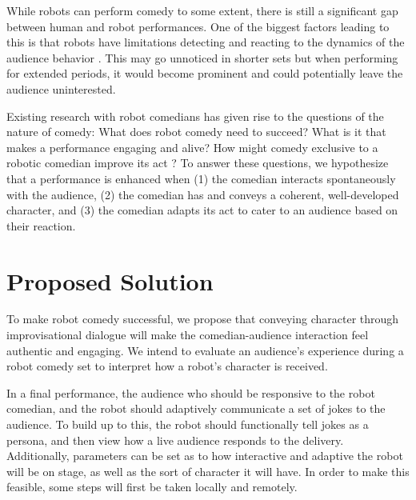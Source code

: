\documentclass[onecolumn, draftclsnofoot,10pt, compsoc]{IEEEtran}
\begin{document}
While robots can perform comedy to some extent, there is still a significant gap between human and robot performances. One of the biggest factors leading to this is that robots have limitations detecting and reacting to the dynamics of the audience behavior {\cite{KatevasRobot:2014}}. This may go unnoticed in shorter sets but when performing for extended periods, it would become prominent and could potentially leave the audience uninterested.

Existing research with robot comedians has given rise to the questions of the nature of comedy: What does robot comedy need to succeed? What is it that makes a performance engaging and alive? How might comedy exclusive to a robotic comedian improve its act {\cite{RobotsMakeThings:2008}}? To answer these questions, we hypothesize that a performance is enhanced when (1) the comedian interacts spontaneously with the audience, (2) the comedian has and conveys a coherent, well-developed character, and (3) the comedian adapts its act to cater to an audience based on their reaction.






\section{Proposed Solution}

To make robot comedy successful, we propose that conveying character through improvisational dialogue will make the comedian-audience interaction feel authentic and engaging. We intend to evaluate an audience's experience during a robot comedy set to interpret how a robot’s character is received.

	In a final performance, the audience who should be responsive to the robot comedian, and the robot should adaptively communicate a set of jokes to the audience. To build up to this, the robot should functionally tell jokes as a persona, and then view how a live audience responds to the delivery. Additionally, parameters can be set as to how interactive and adaptive the robot will be on stage, as well as the sort of character it will have. In order to make this feasible, some steps will first be taken locally and remotely.
\end{document}
